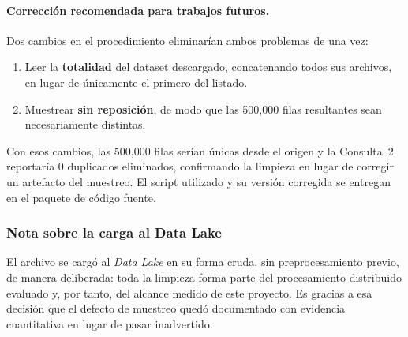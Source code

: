 \paragraph{Corrección recomendada para trabajos futuros.} Dos cambios en el procedimiento eliminarían ambos problemas de una vez:

\begin{enumerate}[leftmargin=*]
    \item Leer la \textbf{totalidad} del dataset descargado, concatenando todos sus archivos, en lugar de únicamente el primero del listado.
    \item Muestrear \textbf{sin reposición}, de modo que las 500,000 filas resultantes sean necesariamente distintas.
\end{enumerate}

Con esos cambios, las 500,000 filas serían únicas desde el origen y la Consulta~2 reportaría 0 duplicados eliminados, confirmando la limpieza en lugar de corregir un artefacto del muestreo. El script utilizado y su versión corregida se entregan en el paquete de código fuente.

\subsubsection{Nota sobre la carga al Data Lake}

El archivo se cargó al \textit{Data Lake} en su forma cruda, sin preprocesamiento previo, de manera deliberada: toda la limpieza forma parte del procesamiento distribuido evaluado y, por tanto, del alcance medido de este proyecto. Es gracias a esa decisión que el defecto de muestreo quedó documentado con evidencia cuantitativa en lugar de pasar inadvertido.

